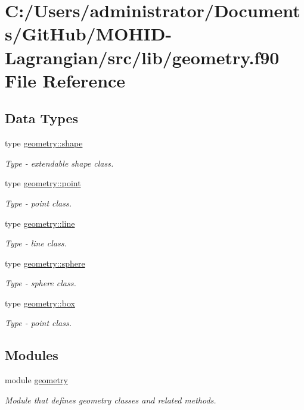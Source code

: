 \hypertarget{geometry_8f90}{}\section{C\+:/\+Users/administrator/\+Documents/\+Git\+Hub/\+M\+O\+H\+I\+D-\/\+Lagrangian/src/lib/geometry.f90 File Reference}
\label{geometry_8f90}
\subsection*{Data Types}
\begin{DoxyCompactItemize}
\item 
type \hyperlink{structgeometry_1_1shape}{geometry\+::shape}
\begin{DoxyCompactList}\small\item\em Type -\/ extendable shape class. \end{DoxyCompactList}\item 
type \hyperlink{structgeometry_1_1point}{geometry\+::point}
\begin{DoxyCompactList}\small\item\em Type -\/ point class. \end{DoxyCompactList}\item 
type \hyperlink{structgeometry_1_1line}{geometry\+::line}
\begin{DoxyCompactList}\small\item\em Type -\/ line class. \end{DoxyCompactList}\item 
type \hyperlink{structgeometry_1_1sphere}{geometry\+::sphere}
\begin{DoxyCompactList}\small\item\em Type -\/ sphere class. \end{DoxyCompactList}\item 
type \hyperlink{structgeometry_1_1box}{geometry\+::box}
\begin{DoxyCompactList}\small\item\em Type -\/ point class. \end{DoxyCompactList}\end{DoxyCompactItemize}
\subsection*{Modules}
\begin{DoxyCompactItemize}
\item 
module \hyperlink{namespacegeometry}{geometry}
\begin{DoxyCompactList}\small\item\em Module that defines geometry classes and related methods. \end{DoxyCompactList}\end{DoxyCompactItemize}
